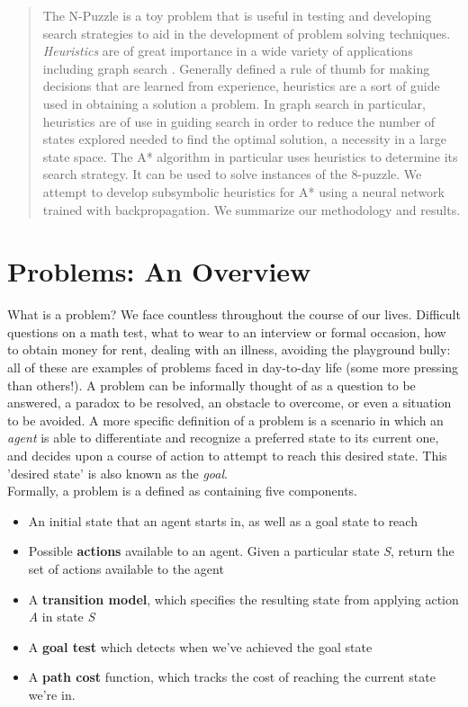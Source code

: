 \documentclass[a4, 12pt]{article}
\begin{document}



\begin{abstract}
The N-Puzzle is a toy problem that is useful in testing and developing search strategies to aid in the development of problem solving techniques. \textit{Heuristics} are of great importance in a wide variety of applications including graph search . Generally defined a rule of thumb for making decisions that are learned from experience, heuristics are a sort of guide used in obtaining a solution a problem. In graph search in particular, heuristics are of use in guiding search in order to reduce the number of states explored needed to find the optimal solution, a necessity in a large state space. The A* algorithm in particular uses heuristics to determine its search strategy. It can be used to solve instances of the 8-puzzle. We attempt to develop subsymbolic heuristics for A* using a neural network trained with backpropagation. We summarize our methodology and results. 
\end{abstract}

\section{Problems: An Overview}
What is a problem? We face countless throughout the course of our lives. Difficult questions on a math test, what to wear to an interview or formal occasion, how to obtain money for rent, dealing with an illness, avoiding the playground bully: all of these are examples of problems faced in day-to-day life (some more pressing than others!).  A problem can be informally thought of as a question to be answered, a paradox to be resolved, an obstacle to overcome, or even a situation to be avoided. A more specific definition of a problem is a scenario in which an \textit{agent} is able to differentiate and recognize a preferred state to its current one, and decides upon a course of action to attempt to reach this desired state. This 'desired state' is also known as the \textit{goal}. \\

Formally, a problem is a defined as containing five components. 
\begin{itemize}
\item An initial state that an agent starts in, as well as a goal state to reach
\item Possible \textbf{actions} available to an agent. Given a particular state \textit{S}, return the set of actions available to the agent
\item  A \textbf{transition model}, which specifies the resulting state from applying action \textit{A} in state \textit{S}

\item A \textbf{goal test} which detects when we've achieved the goal state

\item A \textbf{path cost} function, which tracks the cost of reaching the current state we're in.
\end{itemize}
\end{document}

